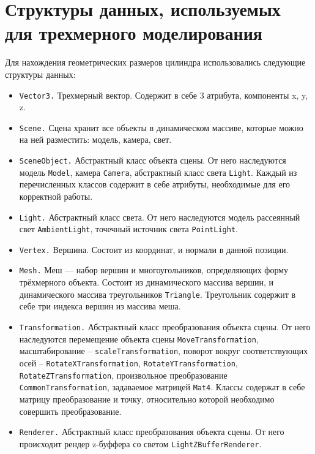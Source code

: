 \section{Структуры данных, используемых для трехмерного моделирования}
Для нахождения геометрических размеров цилиндра использовались следующие структуры данных:

\begin{itemize}
	\item \texttt{Vector3.}
	Трехмерный вектор. Содержит в себе 3 атрибута, компоненты x, y, z.
	
	\item \texttt{Scene.}
	Сцена хранит все объекты в динамическом массиве, которые можно на ней разместить: модель, камера, свет.
	
	\item \texttt{SceneObject.}
	Абстрактный класс объекта сцены. От него наследуются модель \texttt{Model}, камера \texttt{Camera}, абстрактный класс света \texttt{Light}. Каждый из перечисленных классов содержит в себе атрибуты, необходимые для его корректной работы.
	
	\item \texttt{Light.}
	Абстрактный класс света. От него наследуются модель рассеянный свет \texttt{AmbientLight}, точечный источник света \texttt{PointLight}.
	
	\item \texttt{Vertex.}
	Вершина. Состоит из координат, и нормали в данной позиции.
	
	\item \texttt{Mesh.}
	Меш  — набор вершин и многоугольников, определяющих форму трёхмерного объекта.
	Состоит из динамического массива вершин, и динамического массива треугольников \texttt{Triangle}. Треугольник содержит в себе три индекса вершин из массива меша.
	
	\item \texttt{Transformation.}
	Абстрактный класс преобразования объекта сцены. От него наследуются перемещение объекта сцены \texttt{MoveTransformation}, масштабирование -- \texttt{scaleTransformation}, поворот вокруг соответствующих осей -- \texttt{RotateXTransformation}, \texttt{RotateYTransformation}, \texttt{RotateZTransformation}, произвольное преобразование \texttt{CommonTransformation}, задаваемое матрицей \texttt{Mat4}. Классы содержат в себе матрицу преобразование и точку, относительно которой необходимо совершить преобразование.
	
	\item \texttt{Renderer.}
	Абстрактный класс преобразования объекта сцены. От него происходит рендер z-буффера со светом \texttt{LightZBufferRenderer}.
\end{itemize}

